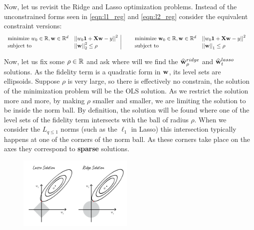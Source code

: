 Now, let us revisit the Ridge and Lasso optimization problems. Instead of the unconstrained forms seen in \ref{eqn:l1_reg} and \ref{eqn:l2_reg} consider the equivalent constraint versions:
$$
\begin{array}{ll|lll}
\text{minimize }w_0\in\mathbb{R},\mathbf{w}\in\mathbb{R}^d & \left|\left| w_0\mathbf{1}+\mathbf{X}\mathbf{w}-y\right|\right|^2 & \quad & \text{minimize }\mathbf{w}_0\in\mathbb{R},\mathbf{w}\in\mathbb{R}^d & \left|\left| w_0\mathbf{1}+\mathbf{X}\mathbf{w}-y\right|\right|^2 \\
\text{subject to} & \left|\left| \mathbf{w}\right|\right|_2^2\leq \rho & &\text{subject to} & \left|\left| \mathbf{w}\right|\right|_1\leq \rho\\
\end{array}
$$

Now, let us fix some $\rho\in\mathbb{R}$ and ask where will we find the $\widehat{\mathbf{w}}_\rho^{ridge}$ and $\widehat{\mathbf{w}}_t^{lasso}$ solutions. As the fidelity term is a quadratic form in $\mathbf{w}$, its level sets are ellipsoids. Suppose $\rho$ is very large, so there is effectively no constrain, the solution of the minimization problem will be the OLS solution. As we restrict the solution more and more, by making $\rho$ smaller and smaller, we are limiting the solution to be inside the norm ball. By definition, the solution will be found where one of the level sets of the fidelity term intersects with the ball of radius $\rho$. When we consider the $L_{q\leq 1}$ norms (such as the $\ell_1$ in Lasso) this intersection typically happens at one of the corners of the norm ball. As these corners take place on the axes they correspond to \textbf{sparse} solutions.

\begin{figure}[!h]
	\centering
	\includegraphics[width=0.5\textwidth]{chapters/regularization.model.selection/figures/6.1.png}
	\caption{}
\end{figure}


